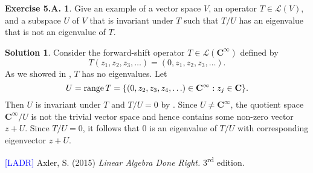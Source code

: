 \documentclass[12pt]{article}
\theoremstyle{definition}
\theoremstyle{exercise}
\newtheorem{exercise}{Exercise 5.A.}
\theoremstyle{solution}
\newtheorem*{solution}{Solution}
\newcommand{\lmap}{\mathcal{L}}
\newcommand{\ts}{\textsuperscript}
\newcommand{\Range}{\text{range\,}}
\newcommand{\C}{\mathbf{C}}
\begin{document}
\begin{exercise}
\label{ex:36}
    Give an example of a vector space \( V \), an operator \( T \in \lmap(V) \), and a subspace \( U \) of \( V \) that is invariant under \( T \) such that \( T/U \) has an eigenvalue that is not an eigenvalue of \( T \).
\end{exercise}

\begin{solution}
    Consider the forward-shift operator \( T \in \lmap(\C^{\infty}) \) defined by
    \[
        T(z_1, z_2, z_3, \ldots) = (0, z_1, z_2, z_3, \ldots).
    \]
    As we showed in , \( T \) has no eigenvalues. Let
    \[
        U = \Range T = \{ (0, z_2, z_3, z_4, \ldots) \in \C^{\infty} : z_j \in \C \}.
    \]
    Then \( U \) is invariant under \( T \) and \( T/U = 0 \) by . Since \( U \neq \C^{\infty} \), the quotient space \( \C^{\infty}/U \) is not the trivial vector space and hence contains some non-zero vector \( z + U \). Since \( T/U = 0 \), it follows that 0 is an eigenvalue of \( T/U \) with corresponding eigenvector \( z + U \).
\end{solution}

\noindent \hrulefill

\noindent \hypertarget{ladr}{\textcolor{blue}{[LADR]} Axler, S. (2015) \textit{Linear Algebra Done Right.} 3\ts{rd} edition.}
\end{document}
